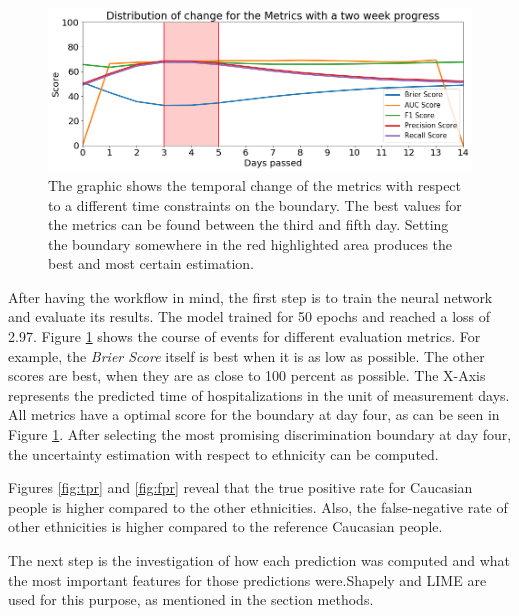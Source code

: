 \documentclass[journal]{IEEEtran}
\begin{document}
\begin{figure}[!b]
	\centering
	\includegraphics[width=0.9\linewidth]{../imgs/metrics_time}
	\caption{The graphic shows the temporal change of the metrics with respect to a different time constraints on the boundary. The best values for the metrics can be found between the third and fifth day. Setting the boundary somewhere in the red highlighted area produces the best and most certain estimation.}
	\label{fig:change}
\end{figure}


\noindent After having the workflow in mind, the first step is to train the neural network and evaluate its results. The model trained for 50 epochs and reached a loss of 2.97. Figure \ref{fig:change} shows the course of events for different evaluation metrics. For example, the \textit{Brier Score} itself is best when it is as low as possible. The other scores are best, when they are as close to 100 percent as possible. The X-Axis represents the predicted time of hospitalizations in the unit of measurement days. All metrics have a optimal score for the boundary at day four, as can be seen in Figure \ref{fig:change}. After selecting the most promising discrimination boundary at day four, the uncertainty estimation with respect to ethnicity can be computed. 

Figures \ref{fig:tpr} and \ref{fig:fpr} reveal that the true positive rate for Caucasian people is higher compared to the other ethnicities. Also, the false-negative rate of other ethnicities is higher compared to the reference Caucasian people.  

The next step is the investigation of how each prediction was computed and what the most important features for those predictions were.Shapely and LIME are used for this purpose, as mentioned in the section methods. 
\end{document}
